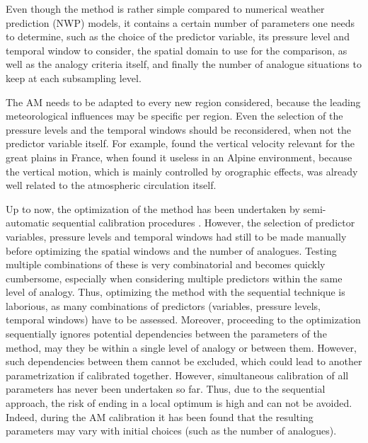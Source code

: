 \documentclass{ametsoc}
\begin{document}
Even though the method is rather simple compared to numerical weather prediction (NWP) models, it contains a certain number of parameters one needs to determine, such as the choice of the predictor variable, its pressure level and temporal window to consider, the spatial domain to use for the comparison, as well as the analogy criteria itself, and finally the number of analogue situations to keep at each subsampling level. 

The AM needs to be adapted to every new region considered, because the leading meteorological influences may be specific per region. Even the selection of the pressure levels and the temporal windows should be reconsidered, when not the predictor variable itself. For example, \citet{BenDaoud2010} found the vertical velocity relevant for the great plains in France, when \citet{Horton2012a} found it useless in an Alpine environment, because the vertical motion, which is mainly controlled by orographic effects, was already well related to the atmospheric circulation itself.

Up to now, the optimization of the method has been undertaken by semi-automatic sequential calibration procedures \citep[see][for its definition]{Bontron2004, Horton2016}. However, the selection of predictor variables, pressure levels and temporal windows had still to be made manually before optimizing the spatial windows and the number of analogues. Testing multiple combinations of these is very combinatorial and becomes quickly cumbersome, especially when considering multiple predictors within the same level of analogy. Thus, optimizing the method with the sequential technique is laborious, as many combinations of predictors (variables, pressure levels, temporal windows) have to be assessed. Moreover, proceeding to the optimization sequentially ignores potential dependencies between the parameters of the method, may they be within a single level of analogy or between them. However, such dependencies between them cannot be excluded, which could lead to another parametrization if calibrated together. However, simultaneous calibration of all parameters has never been undertaken so far. Thus, due to the sequential approach, the risk of ending in a local optimum is high and can not be avoided. Indeed, during the AM calibration it has been found that the resulting parameters may vary with initial choices (such as the number of analogues).
\end{document}
